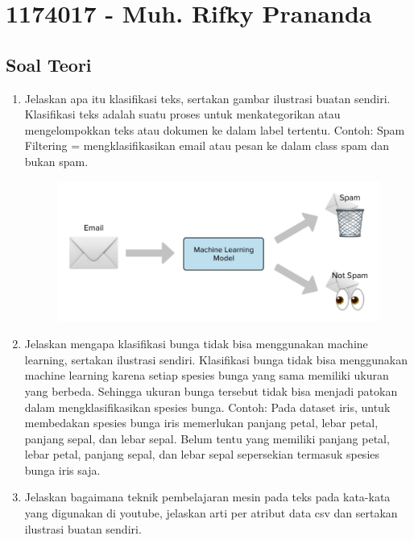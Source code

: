 \section{1174017 - Muh. Rifky Prananda}
\subsection{Soal Teori}
\begin{enumerate}
	\item Jelaskan apa itu klasifikasi teks, sertakan gambar ilustrasi buatan sendiri.
	\hfill\break
	Klasifikasi teks adalah suatu proses untuk menkategorikan atau mengelompokkan teks atau dokumen ke dalam label tertentu.
	\hfill\break
	Contoh:
	\hfill\break
	Spam Filtering = mengklasifikasikan email atau pesan ke dalam class spam dan bukan spam.
	\hfill\break
	\begin{figure}[H]
	\centering
		\includegraphics[width=8 cm]{figures/1174017/chapter4/soalteori/1.PNG}
	\end{figure}

	\item Jelaskan mengapa klasifikasi bunga tidak bisa menggunakan machine learning, sertakan ilustrasi sendiri.
	\hfill\break
	Klasifikasi bunga tidak bisa menggunakan machine learning karena setiap spesies bunga yang sama memiliki ukuran yang berbeda. Sehingga ukuran bunga tersebut tidak bisa menjadi patokan dalam mengklasifikasikan spesies bunga.
	\hfill\break
	Contoh:
	\hfill\break
	Pada dataset iris, untuk membedakan spesies bunga iris memerlukan panjang petal, lebar petal, panjang sepal, dan lebar sepal. Belum tentu yang memiliki panjang petal, lebar petal, panjang sepal, dan lebar sepal sepersekian termasuk spesies bunga iris saja.

	\item Jelaskan bagaimana teknik pembelajaran mesin pada teks pada kata-kata yang digunakan di youtube, jelaskan arti per atribut data csv dan sertakan ilustrasi buatan sendiri.
	

\end{enumerate}
